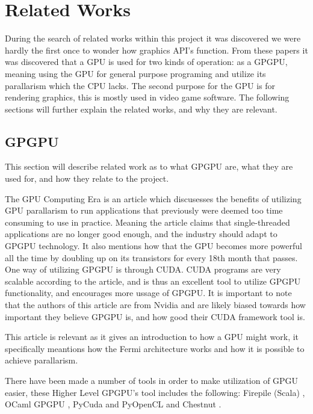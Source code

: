 \section{Related Works}\label{sec:related_works}
During the search of related works within this project it was discovered we were hardly the first once to wonder how graphics \gls{API}'s function. From these papers it was discovered that a \gls{GPU} is used for two kinds of operation: as a GP\gls{GPU}, meaning using the \gls{GPU} for general purpose programing and utilize its parallarism which the CPU lacks. 
The second purpose for the \gls{GPU} is for rendering graphics, this is mostly used in video game software. The following sections will further explain the related works, and why they are relevant.

\subsection{GP\gls{GPU}}
This section will describe related work as to what GP\gls{GPU} are, what they are used for, and how they relate to the project.

The GPU Computing Era \cite{gpu_computing_era} is an article which discusesses the benefits of utilizing \gls{GPU} parallarism to run applications that previously were deemed too time consuming to use in practice. 
Meaning the article claims that single-threaded applications are no longer good enough, and the industry should adapt to GP\gls{GPU} technology. 
It also mentions how that the \gls{GPU} becomes more powerful all the time by doubling up on its transistors for every 18th month that passes. 
One way of utilizing GP\gls{GPU} is through CUDA.
CUDA programs are very scalable according to the article, and is thus an excellent tool to utilize GP\gls{GPU} functionality, and encourages more ussage of GP\gls{GPU}. It is important to note that the authors of this article are from Nvidia and are likely biased towards how important they believe GP\gls{GPU} is, and how good their CUDA framework tool is. 

This article is relevant as it gives an introduction to how a \gls{GPU} might work, it specifically meantions how the Fermi architecture works and how it is possible to achieve parallarism.

There have been made a number of tools in order to make utilization of GPGU easier, these Higher Level GP\gls{GPU}'s tool includes the following: Firepile (Scala) \cite{2011_firepile}, OCaml GP\gls{GPU} \cite{bourgoin_2017_high}, PyCuda and PyOpenCL \cite{2012_pycuda_pyopencl} and Chestnut \cite{stromme_2012_chestnut}.

